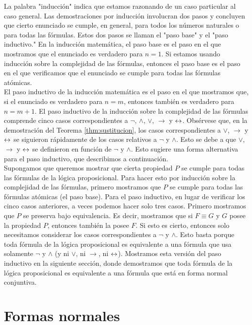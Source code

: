 \documentclass[12pt,a4paper]{book}
\newcommand{\comillas}[1]{"#1"}
\begin{document}
    La palabra \comillas{inducción} indica que estamos razonando de un caso particular al caso general. Las demostraciones por
    inducción involucran dos pasos y concluyen que cierto enunciado se cumple, en general, para todos los números naturales o
    para todas las fórmulas. Estos dos pasos se llaman el \comillas{paso base} y el \comillas{paso inductivo.} En la inducción
    matemática, el paso base es el paso en el que mostramos que el enunciado es verdadero para $n=1$. Si estamos usando
    inducción sobre la complejidad de las fórmulas, entonces el paso base es el paso en el que verificamos que el enunciado se
    cumple para todas las fórmulas atómicas.\\
    El paso inductivo de la inducción matemática es el paso en el que mostramos que, si el enunciado es verdadero para
    $n=m$, entonces también es verdadero para $n=m+1$. El paso inductivo de la inducción sobre la complejidad de las fórmulas
    comprende cinco casos correspondientes a $\neg$, $\wedge$, $\vee$, $\rightarrow$ y $\leftrightarrow$. Obsérvese que, en la
    demostración del Teorema \ref{thm:sustitucion}, los casos correspondientes a $\vee$, $\rightarrow$ y $\leftrightarrow$ se siguieron
    rápidamente de los casos relativos a $\neg$ y $\wedge$. Esto se debe a que $\vee$, $\rightarrow$ y $\leftrightarrow$ se definieron en
    función de $\neg$ y $\wedge$. Esto sugiere una forma alternativa para el paso inductivo, que describimos a continuación.\\
    Supongamos que queremos mostrar que cierta propiedad $P$ se cumple para todas las fórmulas de la lógica proposicional.
    Para hacer esto por inducción sobre la complejidad de las fórmulas, primero mostramos que $P$ se cumple para todas las
    fórmulas atómicas (el paso base). Para el paso inductivo, en lugar de verificar los cinco casos anteriores, a veces
    podemos hacer solo tres casos. Primero mostramos que $P$ se preserva bajo equivalencia. Es decir, mostramos que si
    $F\equiv G$ y $G$ posee la propiedad $P$, entonces también la posee $F$. Si esto es cierto, entonces solo necesitamos
    considerar los casos correspondientes a $\neg$ y $\wedge$. Esto basta porque toda fórmula de la lógica proposicional es
    equivalente a una fórmula que usa solamente $\neg$ y $\wedge$ (y ni $\vee$, ni $\rightarrow$, ni $\leftrightarrow$). Mostramos esta
    versión del paso inductivo en la siguiente sección, donde demostramos que toda fórmula de la lógica proposicional es
    equivalente a una fórmula que está en forma normal conjuntiva.

    \section{Formas normales}
\end{document}
